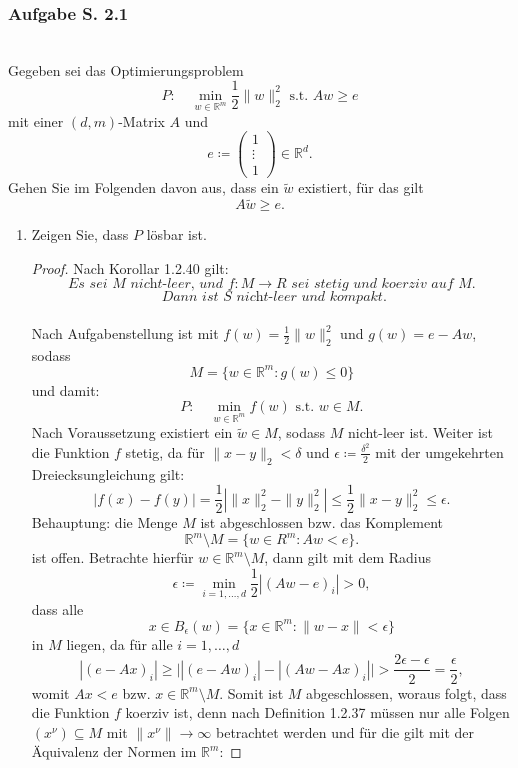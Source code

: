 \documentclass[12pt]{extreport} %
\newcommand{\R}{\mathbb{R}}
\theoremstyle{named}
\theoremstyle{nnamed}
\theoremstyle{itshape}
\theoremstyle{normal}
\begin{document}
\subsubsection{Aufgabe S. 2.1} ~\\

Gegeben sei das Optimierungsproblem
$$ P: \quad \min_{w \in \R^m} \frac{1}{2} \| w \|_2^2 \text{ s.t. } Aw \geq e $$
mit einer $(d, m)$-Matrix $A$ und
$$ e \coloneqq \left(\begin{array}{c} 1 \\ \vdots \\ 1 \end{array}\right) \in \R^d. $$
Gehen Sie im Folgenden davon aus, dass ein $\tilde{w}$ existiert, für das gilt
$$ A \tilde{w} \geq e. $$
\begin{enumerate}
	\item Zeigen Sie, dass $P$ lösbar ist.
		\begin{proof}
			Nach Korollar 1.2.40 gilt:
				$$ \textit{Es sei } M \textit{ nicht-leer, und } f \colon M \rightarrow R \textit{ sei stetig und koerziv auf } M. $$
				$$ \textit{ Dann ist } S \textit{ nicht-leer und kompakt.} $$ ~\\
			Nach Aufgabenstellung ist mit $f(w) = \frac{1}{2} \| w \|_2^2$ und $g(w) = e - Aw$, sodass 
				$$ M = \{ w \in \R^m \colon  g(w) \leq 0 \} $$ 
			und damit:
				$$ P: \quad \min_{w \in \R^m} f(w) \text{ s.t. } w \in M. $$
			Nach Voraussetzung existiert ein $\tilde{w} \in M$, sodass $M$ nicht-leer ist. Weiter ist die Funktion $f$ stetig, da für $\| x - y \|_2 < \delta$ und $\epsilon \coloneqq \frac{\delta^2}{2}$ mit der umgekehrten Dreiecksungleichung gilt:	
			$$ \left| f(x) - f(y) \right| = \frac{1}{2} \left| \| x \|^2_2 - \| y \|_2^2 \right| \leq \frac{1}{2} \| x - y \|_2^2 \leq \epsilon. $$
			Behauptung: die Menge $M$ ist abgeschlossen bzw. das Komplement
			$$ \R^m \setminus M = \{ w \in R^m \colon A w < e \}. $$
			ist offen. Betrachte hierfür $w \in \R^m \setminus M$, dann gilt mit dem Radius
			$$ \epsilon \coloneqq \min_{i = 1, \dotsc, d} \frac{1}{2} \left| (Aw - e)_i \right| > 0, $$ 
			dass alle 
			$$ x \in B_{\epsilon}(w) = \{ x \in \R^m \colon \| w - x \| < \epsilon \} $$
			in $M$ liegen, da für alle $i = 1, \dotsc, d$
			$$ \left| (e - Ax)_i \right| \geq \big| \left| (e - Aw)_i \right| - \left| (Aw - Ax)_i \right| \big| > \frac{2 \epsilon - \epsilon}{2} = \frac{\epsilon}{2}, $$
			womit $Ax < e$ bzw. $x \in \R^m \setminus M$. Somit ist $M$ abgeschlossen, woraus folgt, dass die Funktion $f$ koerziv ist, denn nach Definition 1.2.37 müssen nur alle Folgen $(x^\nu) \subseteq M$ mit $\| x^\nu \| \rightarrow \infty$ betrachtet werden und für die gilt mit der Äquivalenz der Normen im $\R^m$:

\end{proof}
\end{enumerate}
\end{document}
